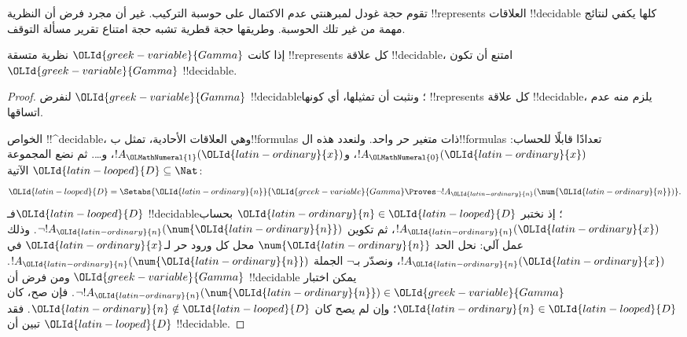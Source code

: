 \documentclass[../../../include/open-logic-section]{subfiles}
\begin{document}


تقوم حجة غودل لمبرهنتي عدم الاكتمال على حوسبة
التركيب. غير أن مجرد فرض أن النظرية !!{represents}
العلاقات !!{decidable} كلها يكفي لنتائج مهمة
من غير تلك الحوسبة. وطريقها حجة قطرية تشبه
حجة امتناع تقرير مسألة التوقف.

\begin{thm}
إذا كانت ${\OLId{greek-variable}{Gamma}}$ نظرية متسقة !!{represents}
كل علاقة !!{decidable}، امتنع أن تكون ${\OLId{greek-variable}{Gamma}}$
!!{decidable}.
\end{thm}

\begin{proof}
لنفرض ${\OLId{greek-variable}{Gamma}}$ !!{decidable}؛ ونثبت أن
تمثيلها، أي كونها !!{represents} كل علاقة
!!{decidable}، يلزم منه عدم اتساقها.

الخواص !!^{decidable}، وهي العلاقات الأحادية،
تمثل ب!!{formula}s ذات متغير حر واحد.
ولنعدد هذه ال!!{formula}s تعدادًا قابلًا
للحساب: $!A_{\OLMathNumeral{0}}({\OLId{latin-ordinary}{x}})$، و$!A_{\OLMathNumeral{1}}({\OLId{latin-ordinary}{x}})$، و\dots.
ثم نضع المجموعة ${\OLId{latin-looped}{D}}\subseteq\Nat$ الآتية:
\[
{\OLId{latin-looped}{D}} = \Setabs{{\OLId{latin-ordinary}{n}}}{{\OLId{greek-variable}{Gamma}} \Proves \lnot !A_{\OLId{latin-ordinary}{n}}(\num{{\OLId{latin-ordinary}{n}}})}.
\]
فـ${\OLId{latin-looped}{D}}$ !!{decidable}؛ إذ نختبر ${\OLId{latin-ordinary}{n}}\in {\OLId{latin-looped}{D}}$
بحساب $!A_{\OLId{latin-ordinary}{n}}({\OLId{latin-ordinary}{x}})$، ثم تكوين $\lnot !A_{\OLId{latin-ordinary}{n}}(\num{{\OLId{latin-ordinary}{n}}})$.
وذلك عمل آلي: نحل الحد $\num{{\OLId{latin-ordinary}{n}}}$ محل كل
ورود حر لـ${\OLId{latin-ordinary}{x}}$ في $!A_{\OLId{latin-ordinary}{n}}({\OLId{latin-ordinary}{x}})$، ونصدّر بـ$\lnot$
الجملة $!A_{\OLId{latin-ordinary}{n}}(\num{{\OLId{latin-ordinary}{n}}})$. ومن فرض أن ${\OLId{greek-variable}{Gamma}}$
!!{decidable} يمكن اختبار
$\lnot !A_{\OLId{latin-ordinary}{n}}(\num{{\OLId{latin-ordinary}{n}}})\in{\OLId{greek-variable}{Gamma}}$. فإن صح،
كان ${\OLId{latin-ordinary}{n}}\in {\OLId{latin-looped}{D}}$؛ وإن لم يصح كان ${\OLId{latin-ordinary}{n}}\notin {\OLId{latin-looped}{D}}$.
فقد تبين أن ${\OLId{latin-looped}{D}}$ !!{decidable}.


\end{proof}
\end{document}
